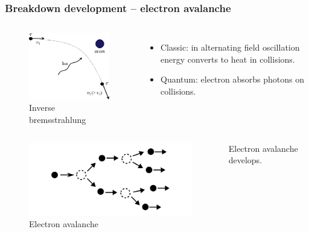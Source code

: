 \documentclass{beamer}
\begin{document}
	\begin{frame}
		\frametitle{Breakdown development -- electron avalanche}
		
		\begin{columns}
			\begin{figure}
				\centering
				\includegraphics[width=0.7\linewidth]{res/inverse_bremsstrahlung.png}
				\caption*{Inverse bremsstrahlung}
			\end{figure}
			\begin{itemize}
				\item Classic: in alternating field oscillation energy converts to heat in collisions.
				\item Quantum: electron absorbs photons on collisions.
			\end{itemize}
		\end{columns}
		\begin{columns}
			\column{0.5\linewidth}
			\begin{figure}
				\centering
				\includegraphics[width=0.8\linewidth]{res/electron_avalanche.png}
				\caption*{Electron avalanche}
			\end{figure}
			
			\column{0.5\linewidth}
			Electron avalanche develops.
			
		\end{columns}		
		

\end{frame}
\end{document}
